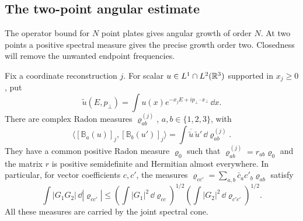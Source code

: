 \subsection{The two-point angular estimate}
\label{subsec:rotation-two-point-estimate}

The operator bound for $N$ point plates gives angular growth of
order $N$. At two points a positive spectral measure gives the
precise growth order two. Closedness will remove the unwanted
endpoint frequencies.

Fix a coordinate reconstruction $j$. For scalar
$u\in L^1\cap L^2(\mathbb R^3)$ supported in $x_j\ge0$, put
\[
 \widetilde u(E,p_\perp)=
       \int u(x)e^{-x_jE+ip_\perp\cdot x_\perp}\,\dd x.
\]
There are complex Radon measures $\varrho^{(j)}_{ab}$,
$a,b\in\{1,2,3\}$, with
\begin{equation}\label{eq:rotation-one-field-spectrum}
 \langle[\mathbb B_a(u)]_j,[\mathbb B_b(u')]_j\rangle
       =\int\overline{\widetilde u}\,\widetilde u'\,
                                    \dd\varrho^{(j)}_{ab}.
\end{equation}
They have a common positive Radon measure $\varrho_0$ such that
$\varrho^{(j)}_{ab}=r_{ab}\varrho_0$ and the matrix $r$ is
positive semidefinite and Hermitian almost everywhere.
In particular, for vector coefficients $c,c'$,
the measures $\varrho_{cc'}=\sum_{a,b}\bar c_ac'_b\varrho_{ab}$
satisfy
\begin{equation}\label{eq:rotation-spectral-CS}
 \int|G_1G_2|\,\dd|\varrho_{cc'}|
 \le\left(\int|G_1|^2\,\dd\varrho_{cc}\right)^{1/2}
       \left(\int|G_2|^2\,\dd\varrho_{c'c'}\right)^{1/2}.
\end{equation}
All these measures are carried by the joint spectral cone.

